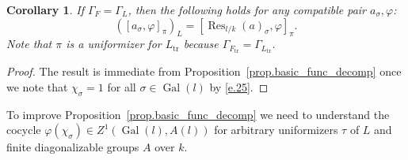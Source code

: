 \documentclass[12pt]{amsart}
\numberwithin{equation}{section}
\newtheorem{corollary}[theorem]{Corollary}
\theoremstyle{definition}
\newcommand{\Gal}{\operatorname{Gal}}
\newcommand{\tr}{\operatorname{tr}}
\newcommand{\Inf}{\operatorname{Res}}
\newcommand{\Ftr}{F_{\tr}}
\newcommand{\Ltr}{L_{\tr}}
\newcommand{\vphi}{\varphi}
\begin{document}
\begin{corollary}\label{cor.field_ext_funct}
   If $\Gamma_{F} = \Gamma_L$, then the following holds for any compatible pair $a_\sigma,\vphi$:
     $$([a_\sigma,\vphi]_{\pi})_L = [\Inf_{l/k}(a)_\sigma,\vphi]_\pi.$$ 
    Note that $\pi$ is a uniformizer for $\Ltr$ because $\Gamma_{\Ftr} = \Gamma_{\Ltr}$.
\end{corollary}
\begin{proof}
    The result is immediate from Proposition~\ref{prop.basic_func_decomp} once we note that $\chi_\sigma = 1$ for all $\sigma\in \Gal(l)$ by  \eqref{e.25}.
\end{proof}

To improve Proposition~\ref{prop.basic_func_decomp} we need to understand the cocycle $\vphi(\chi_\sigma) \in Z^1(\Gal(l),A(l))$ for arbitrary uniformizers $\tau$ of $L$ and finite diagonalizable groups $A$ over $k$.
\end{document}
